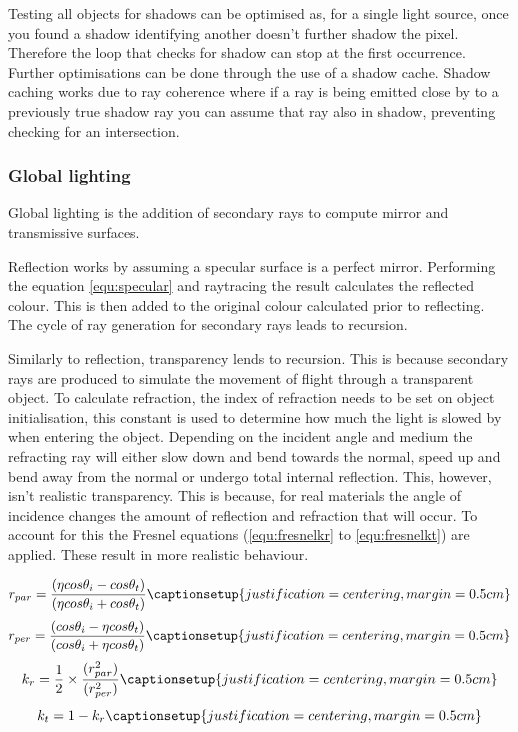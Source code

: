 \documentclass{article}
\begin{document}
Testing all objects for shadows can be optimised as, for a single light source, once you found a shadow identifying another doesn't further shadow the pixel. Therefore the loop that checks for shadow can stop at the first occurrence. Further optimisations can be done through the use of a shadow cache. Shadow caching works due to ray coherence where if a ray is being emitted close by to a previously true shadow ray you can assume that ray also in shadow, preventing checking for an intersection.

\subsubsection{Global lighting}
Global lighting is the addition of secondary rays to compute mirror and transmissive surfaces. 

Reflection works by assuming a specular surface is a perfect mirror. Performing the equation \ref{equ:specular} and raytracing the result calculates the reflected colour. This is then added to the original colour calculated prior to reflecting. The cycle of ray generation for secondary rays leads to recursion. 

Similarly to reflection, transparency lends to recursion. This is because secondary rays are produced to simulate the movement of flight through a transparent object. To calculate refraction, the index of refraction needs to be set on object initialisation, this constant is used to determine how much the light is slowed by when entering the object. Depending on the incident angle and medium the refracting ray will either slow down and bend towards the normal, speed up and bend away from the normal or undergo total internal reflection. 
This, however, isn't realistic transparency. This is because, for real materials the angle of incidence changes the amount of reflection and refraction that will occur. To account for this the Fresnel equations (\ref{equ:fresnelkr} to \ref{equ:fresnelkt}) are applied. These result in more realistic behaviour.

\begin{equation}
r_{par} = \frac{(\eta cos\theta _i - cos \theta _t)}{(\eta cos\theta _i + cos \theta _t)}
\captionsetup{justification=centering,margin=0.5cm}
\label{equ:fresnelrpar}
\end{equation}
\begin{equation}
r_{per} = \frac{(cos\theta _i - \eta cos \theta _t)}{(cos\theta _i + \eta cos \theta _t)}
\captionsetup{justification=centering,margin=0.5cm}
\label{equ:fresnelrper}
\end{equation}
\begin{equation}
k_r = \frac{1}{2}\times\frac{(r_{par}^2)}{(r_{per}^2)}
\captionsetup{justification=centering,margin=0.5cm}
\label{equ:fresnelkr}
\end{equation}
\begin{equation}
k_t = 1 - k_r
\captionsetup{justification=centering,margin=0.5cm}
\label{equ:fresnelkt}
\end{equation}
\end{document}
